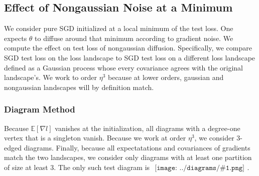 \documentclass{article}
\newcommand{\expct}[1]{\mathbb{E}\left[#1\right]}
\newcommand{\sdia}[1]{\begin{gathered}\texttt{[image: ../diagrams/\#1.png]}\end{gathered}}
\begin{document}
    \subsection*{Effect of Nongaussian Noise at a Minimum}
        We consider pure SGD initialized at a local minimum of the test loss.
        One expects $\theta$ to diffuse around that minimum according to
        gradient noise.  We compute the effect on test loss of nongaussian
        diffusion.  Specifically, we compare SGD test loss on the loss
        landscape to SGD test loss on a different loss landscape defined as a
        Gaussian process whose every covariance agrees with the original
        landscape's.  We work to order $\eta^3$ because at lower orders,
        gaussian and nongaussian landscapes will by definition match. 

        \subsubsection*{Diagram Method}
        Because $\expct{\nabla l}$ vanishes at the initialization, all diagrams
        with a degree-one vertex that is a singleton vanish.  Because we work
        at order $\eta^3$, we consider $3$-edged diagrams.
        Finally, because all expectatations and covariances of gradients
        match the two landscapes, we consider only diagrams with at least one
        partition of size at least $3$.
        The only such test diagram is $\sdia{(012-3)(03-13-23)}$.
\end{document}
